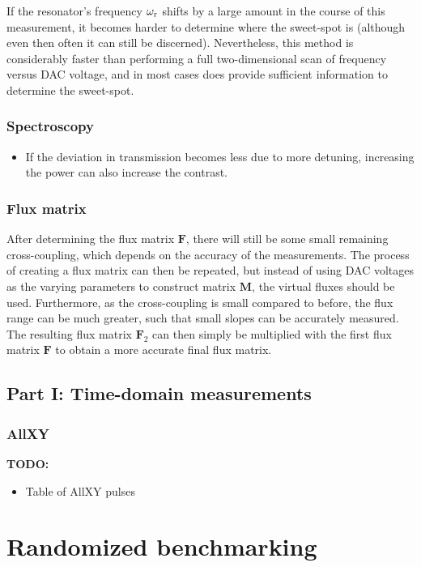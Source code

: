         If the resonator's frequency $\omega_\text{r}$ shifts by a large amount in the course of this measurement, it becomes harder to determine where the sweet-spot is (although even then often it can still be discerned). Nevertheless, this method is considerably faster than performing a full two-dimensional scan of frequency versus DAC voltage, and in most cases does provide sufficient information to determine the sweet-spot.


      \subsubsection{Spectroscopy}
        \begin{itemize}
          \item If the deviation in transmission becomes less due to more detuning, increasing the power can also increase the contrast.
        \end{itemize}
      \subsubsection{Flux matrix}
        After determining the flux matrix $\boldsymbol{F}$, there will still be some small remaining cross-coupling, which depends on the accuracy of the measurements. The process of creating a flux matrix can then be repeated, but instead of using DAC voltages as the varying parameters to construct matrix $\boldsymbol{M}$, the virtual fluxes should be used. Furthermore, as the cross-coupling is small compared to before, the flux range can be much greater, such that small slopes can be accurately measured. The resulting flux matrix $\boldsymbol{F}_2$ can then simply be multiplied with the first flux matrix $\boldsymbol{F}$ to obtain a more accurate final flux matrix.
    \subsection{Part I: Time-domain measurements}
      \subsubsection{AllXY}
        \label{ssec:AllXY}
        \textbf{TODO:}
        \begin{itemize}
          \item Table of AllXY pulses
        \end{itemize}
  \section{Randomized benchmarking}
